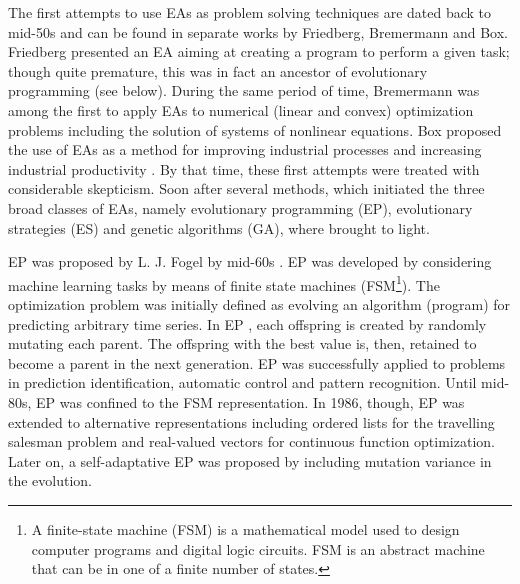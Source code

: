 The first attempts to use EAs as problem solving techniques are dated back to mid-50s and can be found in separate works by Friedberg, Bremermann and Box. Friedberg \cite{Friedberg:1958:LMP:1662346.1662347, Friedberg:1959:LMP:1661923.1661930} presented an EA aiming at creating a program to perform a given task; though quite premature, this was in fact an ancestor of evolutionary programming (see below). During the same period of time, Bremermann \cite{Bremermann_62} was among the first to apply EAs to numerical (linear and convex) optimization problems including the solution of systems of nonlinear equations. Box proposed the use of EAs as a method for improving industrial processes and increasing industrial productivity \cite{Box57a,BoDr98a}. By that time, these first attempts were treated with considerable skepticism. Soon after several methods, which initiated the three broad classes of EAs, namely evolutionary programming (EP), evolutionary strategies (ES) and genetic algorithms (GA), where brought to light.

EP was proposed by L. J. Fogel by mid-60s  \cite{fogel62,fogel64,fogel66}. EP was developed by considering machine learning tasks by means of finite state machines (FSM\footnote{A finite-state machine (FSM) is a mathematical model used to design computer programs and digital logic circuits. FSM is an abstract machine that can be in one of a finite number of states.}). The optimization problem was  initially defined as evolving an algorithm (program) for predicting arbitrary time series.  In EP  \cite{Fogel}, each offspring is created by randomly mutating each parent. The offspring with the best value is, then, retained to become a parent in the next generation. EP was successfully applied to problems in prediction identification, automatic control and pattern recognition. Until mid-80s, EP was confined to the FSM representation. In 1986, though, EP was extended to alternative representations including ordered lists for the travelling salesman problem and real-valued vectors for continuous function optimization. Later on, a self-adaptative EP \cite{fogel95} was proposed by including mutation variance in the evolution.

